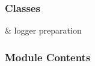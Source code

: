\documentclass[letterpaper,10pt,english]{sphinxmanual}
\begin{document}
\subsubsection{Classes}
\label{\detokenize{autoapi/logging_utils/index:classes}}

\begin{savenotes}\sphinxattablestart
\sphinxthistablewithglobalstyle
\sphinxthistablewithnovlinesstyle
\centering
\begin{tabulary}{\linewidth}[t]{}
\sphinxtoprule
\sphinxtableatstartofbodyhook
\sphinxAtStartPar
{}
&
\sphinxAtStartPar
logger preparation
\\
\sphinxbottomrule
\end{tabulary}
\sphinxtableafterendhook\par
\sphinxattableend\end{savenotes}


\subsubsection{Module Contents}
\label{\detokenize{autoapi/logging_utils/index:module-contents}}
\end{document}
